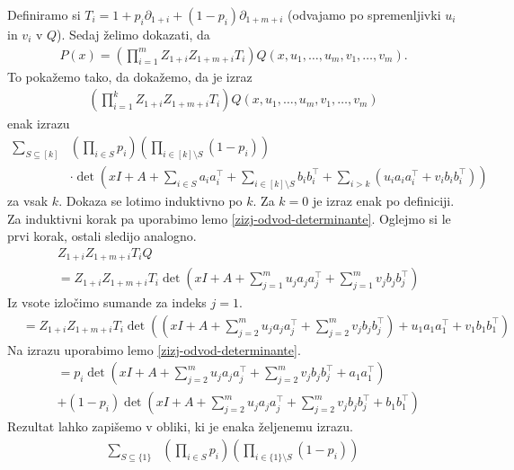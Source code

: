 \begin{dokaz}
    Definiramo si \(T_i = 1+p_i\partial_{1+i} + (1-p_i)\partial_{1+m+i}\) (odvajamo po spremenljivki \(u_i\) in \(v_i\) v \(Q\)). Sedaj želimo dokazati, da
    \begin{align*}
        P(x) = \left(\prod_{i=1}^m Z_{1+i}Z_{1+m+i}T_i\right)Q(x, u_1, \ldots, u_m, v_1, \ldots, v_m).
    \end{align*}
    To pokažemo tako, da dokažemo, da je izraz
    \begin{align*}
        \left(\prod_{i=1}^k Z_{1+i}Z_{1+m+i}T_i\right)Q(x, u_1, \ldots, u_m, v_1, \ldots, v_m)
    \end{align*}
    enak izrazu
    \begin{align*}
        \sum_{S\subseteq [k]} & \left(\prod_{i\in S} p_i\right)\left(\prod_{i\in [k]\setminus S} \left(1-p_i\right)\right) \\
                              & \cdot\det\left(xI + A + \sum_{i\in S} a_i a_i^\top + \sum_{i\in [k]\setminus S} b_i b_i^\top + \sum_{i>k} \left( u_i a_i a_i^\top + v_i b_i b_i^\top\right)\right)
    \end{align*}
    za vsak \(k\). Dokaza se lotimo induktivno po \(k\). Za \(k=0\) je izraz enak po definiciji. Za induktivni korak pa uporabimo lemo \ref{zizj-odvod-determinante}. Oglejmo si le prvi korak, ostali sledijo analogno.
    \begin{align*}
         & Z_{1+i} Z_{1+m+i} T_i Q \\
         & =Z_{1+i} Z_{1+m+i} T_i \det\left(xI + A + \sum_{j=1}^m u_j a_j a_j^\top + \sum_{j=1}^m v_j b_j b_j^\top\right)
    \end{align*}
    Iz vsote izločimo sumande za indeks \(j=1\).
    \begin{align*}
         & =Z_{1+i} Z_{1+m+i} T_i \det\left(\left(xI + A + \sum_{j=2}^m u_j a_j a_j^\top + \sum_{j=2}^m v_j b_j b_j^\top\right) + u_1 a_1 a_1^\top + v_1 b_1 b_1^\top\right)
    \end{align*}
    Na izrazu uporabimo lemo \ref{zizj-odvod-determinante}.
    \begin{align*}
         & = p_i \det\left(xI + A + \sum_{j=2}^m u_j a_j a_j^\top + \sum_{j=2}^m v_j b_j b_j^\top + a_1 a_1^\top\right) \\
         & + (1-p_i) \det\left(xI + A + \sum_{j=2}^m u_j a_j a_j^\top + \sum_{j=2}^m v_j b_j b_j^\top + b_1 b_1^\top\right)
    \end{align*}
    Rezultat lahko zapišemo v obliki, ki je enaka željenemu izrazu.
    \begin{align*}
        \sum_{S\subseteq \{1\}} & \left(\prod_{i\in S} p_i\right)\left(\prod_{i\in \{1\}\setminus S} \left(1-p_i\right)\right)  \\

\end{align*}
\end{dokaz}
